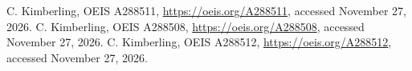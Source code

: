  C. Kimberling, OEIS A288511,
\url{https://oeis.org/A288511}, accessed November 27, 2026.
 C. Kimberling, OEIS A288508,
\url{https://oeis.org/A288508}, accessed November 27, 2026.
 C. Kimberling, OEIS A288512,
\url{https://oeis.org/A288512}, accessed November 27, 2026.
